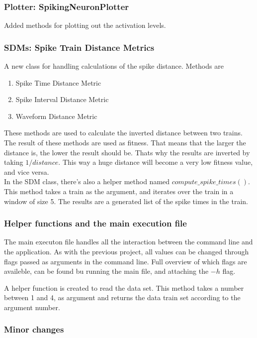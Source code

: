 \subsubsection{Plotter: SpikingNeuronPlotter}
Added methods for plotting out the activation levels. 


\subsubsection{SDMs: Spike Train Distance Metrics}
\label{sec:sdm}
A new class for handling calculations of the spike distance. Methods are 

\begin{enumerate}
	\item Spike Time Distance Metric
	\item Spike Interval Distance Metric
	\item Waveform Distance Metric
\end{enumerate}

These methods are used to calculate the inverted distance between two trains. The result of these
methods are used as fitness. That means that the larger the distance is, the lower the result should be.
Thats why the results are inverted by taking $1/distance$. This way a huge distance will become a very
low fitness value, and vice versa.  \\

In the SDM class, there's also a helper method named $compute\_spike\_times()$. This method
takes a train as the argument, and iterates over the train in a window of size 5. The results
are a generated list of the spike times in the train. 

\subsubsection{Helper functions and the main execution file}

The main executon file handles all the interaction between the command line and the application. As
with the previous project, all values can be changed through flags passed as arguments in the command
line. Full overview of which flags are availeble, can be found bu running the main file, and attaching the $-h$ flag. 

A helper function is created to read the data set. This method takes a number between 1 and 4, as argument and 
returns the data train set according to the argument number.

\subsubsection{Minor changes}
\label{sec:geneticchanges}


